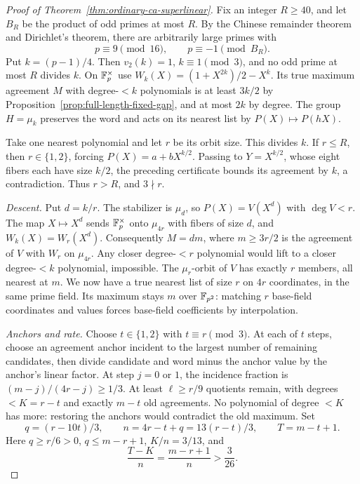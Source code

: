 \begin{proof}[Proof of Theorem~\ref{thm:ordinary-ca-superlinear}]
Fix an integer $R\ge40$, and let $B_R$ be the product of odd primes at
most $R$. By the Chinese remainder theorem and Dirichlet's theorem,
there are arbitrarily large primes with
\[
 p\equiv9\pmod{16},\qquad p\equiv-1\pmod{B_R}.
\]
Put $k=(p-1)/4$. Then $v_2(k)=1$, $k\equiv1\pmod3$, and no odd prime
at most $R$ divides $k$. On $\mathbb F_p^\times$ use
$W_k(X)=(1+X^{2k})/2-X^k$. Its true maximum agreement $M$ with
degree-$<k$ polynomials is at least $3k/2$ by
Proposition~\ref{prop:full-length-fixed-gap}, and at most $2k$ by degree.
The group $H=\mu_k$ preserves the word and acts on its nearest list
by $P(X)\mapsto P(hX)$.

Take one nearest polynomial and let $r$ be its orbit size. This divides
$k$. If $r\le R$, then $r\in\{1,2\}$, forcing
$P(X)=a+bX^{k/2}$. Passing to $Y=X^{k/2}$, whose eight fibers each have
size $k/2$, the preceding certificate bounds its agreement by $k$,
a contradiction. Thus $r>R$, and $3\nmid r$.

\emph{Descent.} Put $d=k/r$. The stabilizer is $\mu_d$, so
$P(X)=V(X^d)$ with $\deg V<r$. The map $X\mapsto X^d$ sends
$\mathbb F_p^\times$ onto $\mu_{4r}$ with fibers of size $d$, and
$W_k(X)=W_r(X^d)$. Consequently $M=dm$, where $m\ge3r/2$ is the
agreement of $V$ with $W_r$ on $\mu_{4r}$. Any closer degree-$<r$
polynomial would lift to a closer degree-$<k$ polynomial, impossible.
The $\mu_r$-orbit of $V$ has exactly $r$ members, all nearest at $m$.
We now have a true nearest list of size $r$ on $4r$ coordinates, in the
same prime field. Its maximum stays $m$ over $\mathbb F_{p^2}$: matching $r$
base-field coordinates and values forces base-field coefficients by
interpolation.

\emph{Anchors and rate.} Choose $t\in\{1,2\}$ with $t\equiv r\pmod3$.
At each of $t$ steps, choose an agreement anchor incident to the largest
number of remaining candidates, then divide candidate and word minus
the anchor value by the anchor's linear factor. At step $j=0$ or $1$,
the incidence fraction is $(m-j)/(4r-j)\ge1/3$. At least
$\ell\ge r/9$ quotients remain, with degrees $<K=r-t$ and exactly
$m-t$ old agreements. No polynomial of degree $<K$ has more: restoring
the anchors would contradict the old maximum. Set
\[
 q=(r-10t)/3,\qquad n=4r-t+q=13(r-t)/3,\qquad T=m-t+1.
\]
Here $q\ge r/6>0$, $q\le m-r+1$, $K/n=3/13$, and
\[
 \frac{T-K}{n}=\frac{m-r+1}{n}>\frac3{26}.
\]


\end{proof}

